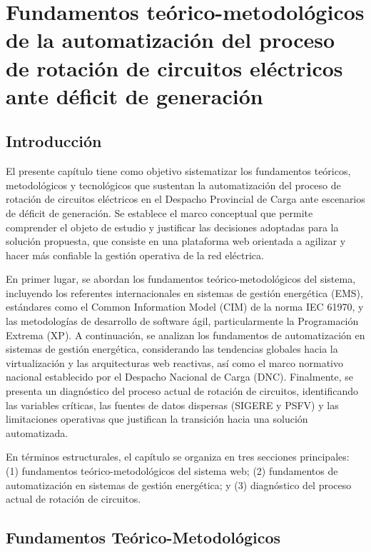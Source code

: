 \chapter{Fundamentos teórico-metodológicos de la automatización del proceso de rotación de circuitos eléctricos ante déficit de generación}

\section{Introducción}

El presente capítulo tiene como objetivo sistematizar los fundamentos teóricos, metodológicos y tecnológicos que sustentan la automatización del proceso de rotación de circuitos eléctricos en el Despacho Provincial de Carga ante escenarios de déficit de generación. Se establece el marco conceptual que permite comprender el objeto de estudio y justificar las decisiones adoptadas para la solución propuesta, que consiste en una plataforma web orientada a agilizar y hacer más confiable la gestión operativa de la red eléctrica.

En primer lugar, se abordan los fundamentos teórico-metodológicos del sistema, incluyendo los referentes internacionales en sistemas de gestión energética (EMS), estándares como el Common Information Model (CIM) de la norma IEC 61970, y las metodologías de desarrollo de software ágil, particularmente la Programación Extrema (XP). A continuación, se analizan los fundamentos de automatización en sistemas de gestión energética, considerando las tendencias globales hacia la virtualización y las arquitecturas web reactivas, así como el marco normativo nacional establecido por el Despacho Nacional de Carga (DNC). Finalmente, se presenta un diagnóstico del proceso actual de rotación de circuitos, identificando las variables críticas, las fuentes de datos dispersas (SIGERE y PSFV) y las limitaciones operativas que justifican la transición hacia una solución automatizada.

En términos estructurales, el capítulo se organiza en tres secciones principales: (1) fundamentos teórico-metodológicos del sistema web; (2) fundamentos de automatización en sistemas de gestión energética; y (3) diagnóstico del proceso actual de rotación de circuitos.

\section{Fundamentos Teórico-Metodológicos}

